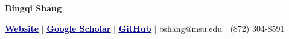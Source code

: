 \documentclass{resume}
\newcommand*{\git}{\vcenter{\hbox{\texttt{[image: icon/Git.png]}}}}
\newcommand*{\Google}{\vcenter{\hbox{\texttt{[image: icon/Google.png]}}}}
\newcommand*{\web}{\vcenter{\hbox{\texttt{[image: icon/Web.png]}}}}
\newcommand*{\phone}{\vcenter{\hbox{\texttt{[image: icon/Phone.png]}}}}
\begin{document}




\begin{center}
    \huge{\textbf{Bingqi Shang}}
    
    \vspace{0.2cm}
    \small
    \faGlobe\;\href{https://bio.bingqi-shang.com/}{\textcolor{darkblue}{\underline{\textbf{Website}}}} 
    \hspace{1mm}$|$\hspace{1mm}
    \faGraduationCap\;\href{https://scholar.google.com/citations?authuser=3&user=8xedwl0AAAAJ}{\textcolor{darkblue}{\bf\underline{Google Scholar}}} 
    \hspace{1mm}$|$\hspace{1mm}
    \faGithub\;\href{https://github.com/bshang17}{\textcolor{darkblue}{\bf\underline{GitHub}}}
    \hspace{1mm}$|$\hspace{1mm}
    \faEnvelope\;bshang@msu.edu
    \hspace{1mm}$|$\hspace{1mm}
    \faPhone\;(872) 304-8591
\end{center}
    
\end{document}

